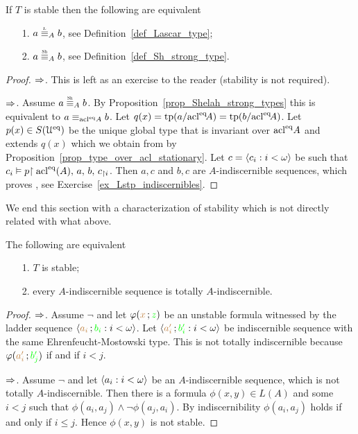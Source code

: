 \documentclass[creche.tex]{subfiles}
\begin{document}
\begin{corollary}
If $T$ is stable then the following are equivalent
\begin{itemize}
\item[1.] $a\equivL_A b$, see Definition~\ref{def_Lascar_type};
\item[2.] $a\equivSh_A b$, see Definition~\ref{def_Sh_strong_type}.
\end{itemize}
\end{corollary}
\begin{proof}$\Rightarrow$. This is left as an exercise to the reader (stability is not required).

$\Rightarrow$. Assume $a\equivSh_A b$. By Proposition~\ref{prop_Shelah_strong_types} this is equivalent to $a\equiv_{\mathop{\rm acl}^{{\rm eq}}\!A} b$. Let $q(x)={\rm tp}(a/{\mathop{\rm acl}}^{{\rm eq}}\!A)={\rm tp}(b/{\mathop{\rm acl}}^{{\rm eq}}\!A)$. Let $p(x)\in S(\EuScript U^{{\rm eq}})$ be the unique global type that is invariant over $\mathop{\rm acl}^{{\rm eq}}\! A$ and extends $q(x)$ which we obtain from by Proposition~\ref{prop_type_over_acl_stationary}. Let $c=\langle c_i:i<\omega\rangle$ be such that $c_i\vDash p{\restriction \mathop{\rm acl}^{{\rm eq}}(A),\,a,\,b,\,c_{\restriction i}}$. Then $a,c$ and $b,c$ are $A$-indiscernible sequences, which proves , see Exercise~\ref{ex_Lstp_indiscernibles}.
\end{proof}

We end this section with a characterization of stability which is not directly related with what above. 

\begin{proposition} The following are equivalent
\begin{itemize}
\item[1.] $T$ is stable;
\item[2.] every $A$-indiscernible sequence is totally $A$-indiscernible.
\end{itemize}
\end{proposition}

\begin{proof}
$\Rightarrow$. Assume $\neg$ and let $\varphi({\color{brown} x}\,;{\color{green} z})$ be an unstable formula witnessed by the ladder sequence $\langle{\color{brown}a_i}\,;{\color{green} b_i}:i<\omega\rangle$. Let $\langle{\color{brown}a'_i}\,;{\color{green} b'_i} : i<\omega\rangle$ be 
indiscernible sequence with the same Ehren\-feucht-Mostowski type. This is not totally indiscernible because $\varphi({\color{brown} a'_i}\,;{\color{green} b'_j})$ if and if $i< j$.

$\Rightarrow$. Assume $\neg$ and let $\langle a_i : i<\omega\rangle$ be an $A$-indiscernible sequence, which is not totally $A$-in\-dis\-cern\-ible. Then there is a formula $\phi(x, y)\in L(A)$ and some $i<j$ such that $\phi(a_i , a_j )\wedge\neg\phi(a_j , a_i) $. By indiscernibility  $\phi(a_i, a_j)$ holds if and only if $i\le j$. Hence $\phi(x, y)$ is not stable.
\end{proof}
\end{document}
